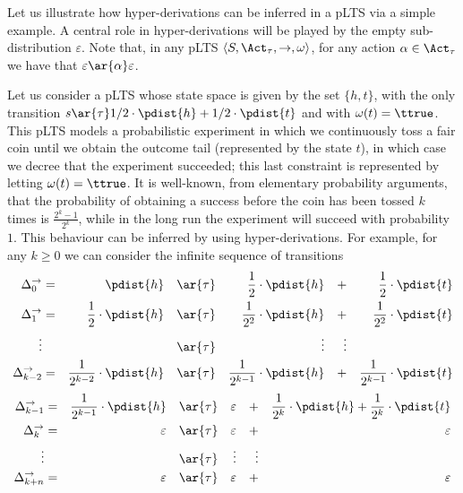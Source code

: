 \documentclass{LMCS}
\begin{document}
\begin{exa}
\label{ex:hyperderivative}
Let us illustrate how hyper-derivations can be inferred in a pLTS via a simple example. 
A central role in hyper-derivations will be played by the empty sub-distribution 
$\varepsilon$. Note that, in any pLTS $\langle S, \Act_\tau, \rightarrow, \omega \rangle$, 
for any action $\alpha \in \Act_{\tau}$ we have that $\varepsilon \ar{\alpha} \varepsilon$.

Let us consider a pLTS whose state space is given by the set $\{h,t\}$, with 
the only transition $s \ar{\tau} 1/2 \cdot \pdist{h} + 1/2 \cdot \pdist{t}$ 
and with $\omega(t) = \ttrue$. 
This pLTS models a probabilistic experiment in which we continuously toss a fair coin 
until we obtain the outcome tail (represented by the state $t$), in which case we decree that the experiment succeeded; 
this last constraint is represented by letting $\omega(t) = \ttrue$.
It is well-known, from elementary probability arguments, 
that the probability of obtaining a success before the coin has been tossed $k$ times
is $\frac{2^{k}-1}{2^k}$, while in the long run the experiment will succeed with probability 
$1$. 
This behaviour can be inferred by using hyper-derivations. For example, 
for any $k \geq 0$ we can consider the infinite sequence of transitions 
\begin{align*}
\Delta_0^{\rightarrow} &=&  \pdist{h} &&\ar{\tau}&& \frac{1}{2}\cdot \pdist{h} &&+&& 
\frac{1}{2} \cdot \pdist{t}\\
 \Delta_1^{\rightarrow} &=& \frac{1}{2} \cdot \pdist{h} &&\ar{\tau}&& \frac{1}{2^2} \cdot \pdist{h} &&+&& \frac{1}{2^2} \cdot \pdist{t}\\
 \vdots&&&&\ar{\tau}&&\vdots&&\vdots\\
 \Delta_{k-2}^{\rightarrow} &=& \frac{1}{2^{k-2}} \cdot 
 \pdist{h} &&\ar{\tau}&& \frac{1}{2^{k-1}} \cdot \pdist{h} &&+&& 
 \frac{1}{2^{k-1}} \cdot \pdist{t}\\
\end{align*}
\begin{align*}
 \Delta_{k-1}^{\rightarrow} &=& \frac{1}{2^{k-1}}\cdot\pdist{h} &&\ar{\tau} && 
 \varepsilon &&+&& \frac{1}{2^{k}} \cdot \pdist{h} + \frac{1}{2^{k}} \cdot \pdist{t}\\
 \Delta_{k}^{\rightarrow} &=& \varepsilon &&\ar{\tau} && \varepsilon &&+&& \varepsilon\\
  \vdots&&&&\ar{\tau}&&\vdots&&\vdots\\
  \Delta_{k+n}^{\rightarrow} &=& \varepsilon &&\ar{\tau} && \varepsilon &&+&& \varepsilon\\

\end{align*}
\end{exa}
\end{document}

